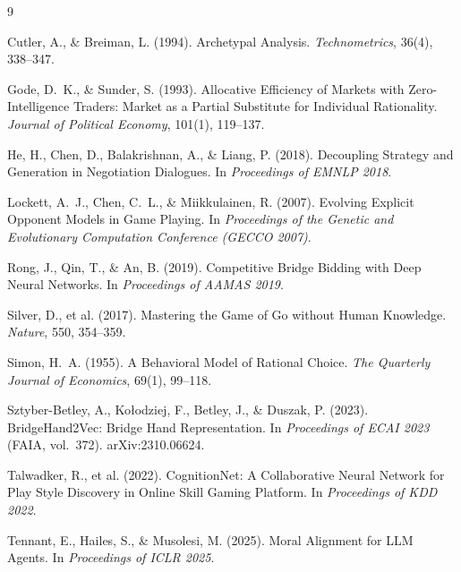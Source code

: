 \documentclass[11pt, a4paper, oneside, openany]{report}
\begin{document}
\clearpage
\renewcommand{\bibname}{References}
\begin{thebibliography}{9}

Cutler, A., \& Breiman, L. (1994). Archetypal Analysis.
\emph{Technometrics}, 36(4), 338--347.

Gode, D.~K., \& Sunder, S. (1993). Allocative Efficiency of Markets with
Zero-Intelligence Traders: Market as a Partial Substitute for Individual
Rationality. \emph{Journal of Political Economy}, 101(1), 119--137.

He, H., Chen, D., Balakrishnan, A., \& Liang, P. (2018). Decoupling Strategy
and Generation in Negotiation Dialogues. In \emph{Proceedings of EMNLP 2018}.

Lockett, A.~J., Chen, C.~L., \& Miikkulainen, R. (2007). Evolving Explicit
Opponent Models in Game Playing. In \emph{Proceedings of the Genetic and
Evolutionary Computation Conference (GECCO 2007)}.

Rong, J., Qin, T., \& An, B. (2019). Competitive Bridge Bidding with Deep
Neural Networks. In \emph{Proceedings of AAMAS 2019}.

Silver, D., et al. (2017). Mastering the Game of Go without Human Knowledge.
\emph{Nature}, 550, 354--359.

Simon, H.~A. (1955). A Behavioral Model of Rational Choice.
\emph{The Quarterly Journal of Economics}, 69(1), 99--118.

Sztyber-Betley, A., Ko{\l}odziej, F., Betley, J., \& Duszak, P. (2023).
BridgeHand2Vec: Bridge Hand Representation. In \emph{Proceedings of ECAI 2023}
(FAIA, vol.~372). arXiv:2310.06624.

Talwadker, R., et al. (2022). CognitionNet: A Collaborative Neural Network for
Play Style Discovery in Online Skill Gaming Platform. In \emph{Proceedings of
KDD 2022}.

Tennant, E., Hailes, S., \& Musolesi, M. (2025). Moral Alignment for LLM
Agents. In \emph{Proceedings of ICLR 2025}.

\end{thebibliography}
\end{document}
